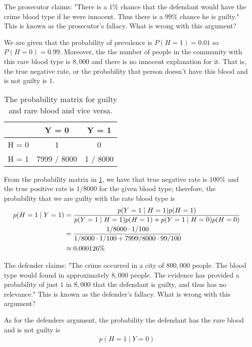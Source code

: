 \begin{exercise}
	\begin{exercise}
	\item
		The prosecutor claims: "There is a \(1\%\) chance that the defendant would have the crime blood type if he
		were innocent. Thus there is a \(99\%\) chance he is guilty." This is known as the prosecutor's fallacy.
		What is wrong with this argument?
		\par\smallskip
		We are given that the probability of prevalence is \(P(H = 1) = 0.01\) so \(P(H = 0) = 0.99\). Moreover, the
		the number of people in the community with this rare blood type is \(8,000\) and there is no innocent
		explanation for it. That is, the true negative rate, or the probability that person doesn't have this blood
		and is not guilty is \(1\).
		\begin{table}
		\centering
			\begin{tabular}{l | c c}
				& Y = 0 & Y = 1\\ \hline
				H = 0 & 1 & 0\\
				H = 1 & 7999 / 8000 & 1 / 8000
			\end{tabular}
			\caption{The probability matrix for guilty and rare blood and vice versa.}
			\label{ch2_ex21}
		\end{table}
		From the probability matrix in \cref{ch2_ex21}, we have that true negative rate is \(100\%\) and the true 
		positive rate is \(1 / 8000\) for the given blood type; therefore, the probability that we are guilty with the
		rate blood type is
		\begin{align}
			p(H = 1\mid Y = 1) 
			&= \frac{p(Y = 1\mid H = 1) p(H = 1)}{p(Y = 1\mid H = 1) p(H = 1) + p(Y = 1\mid H = 0) p(H = 0)}
			\notag\\
			&= \frac{1 / 8000\cdot 1 / 100}{1 / 8000\cdot 1 / 100 + 7999 / 8000 \cdot 99 / 100}\notag\\
			&\approx 0.000126\%\notag
		\end{align}
	\item
		The defender claims: "The crime occurred in a city of \(800,000\) people. The blood type would found in
		approximately \(8,000\) people. The evidence has provided a probability of just \(1\) in \(8,000\) that the
		defendant is guilty, and thus has no relevance." This is known as the defender's fallacy. 
		What is wrong with this argument?
		\par\smallskip
		As for the defenders argument, the probability the defendant has the rare blood and is not guilty is
		\begin{align}
			p(H = 1\mid Y = 0) 

\end{align}
\end{exercise}
\end{exercise}
